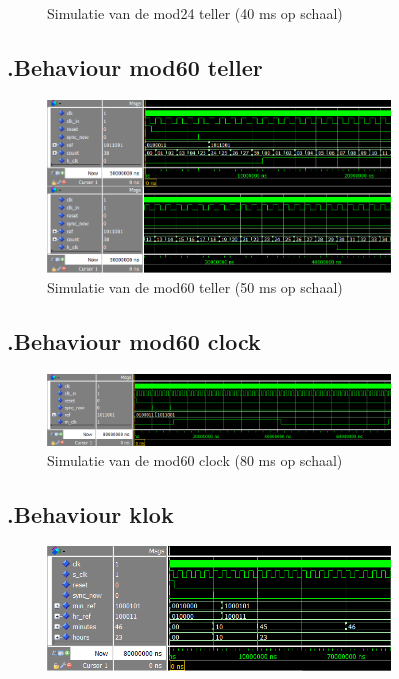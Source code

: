 \begin{figure}[ht!]
\begin{figure}[ht!]
\caption{Simulatie van de mod24 teller (40 ms op schaal)}
\end{figure}
\subsection*{\label{fig: mod601_beh}\thesubsection.\quad Behaviour mod60 teller}
\begin{figure}[ht!]
\includegraphics[width=\textwidth,height=\textheight,keepaspectratio]{Figuren/DCF77/Mod60_teller.png}
\caption{Simulatie van de mod60 teller (50 ms op schaal)}
\end{figure}
\subsection*{\label{fig: mod602_beh}\thesubsection.\quad Behaviour mod60 clock}
\begin{figure}[ht!]
\includegraphics[width=\textwidth,height=\textheight,keepaspectratio]{Figuren/DCF77/Mod60_clock.png}
\caption{Simulatie van de mod60 clock (80 ms op schaal)}
\end{figure}
\subsection*{\label{fig: klok_beh}\thesubsection.\quad Behaviour klok}
\begin{figure}[ht!]
\includegraphics[width=\textwidth,height=\textheight,keepaspectratio]{Figuren/DCF77/Klok.png}

\end{figure}
\end{figure}
